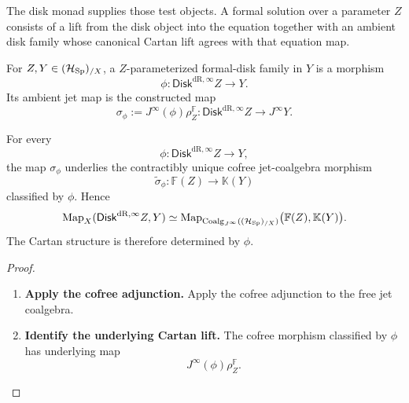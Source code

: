 The disk monad supplies those test objects. A formal solution over a parameter
\(Z\) consists of a lift from the disk object into the equation together with
an ambient disk family whose canonical Cartan lift agrees with that equation
map.
\begin{definition}
For \(Z,Y\in(\mathcal H_{\operatorname{Sp}})_{/X}\), a \(Z\)-parameterized formal-disk family in
\(Y\) is a morphism
\[
  \phi:\mathsf{Disk}^{\mathrm{dR},\infty} Z\to Y.
\]
Its ambient jet map is the constructed map
\[
  \sigma_\phi
  :=
  J^\infty(\phi)\rho_Z^{\mathbb F}:
  \mathsf{Disk}^{\mathrm{dR},\infty} Z\to J^\infty Y.
\]
\end{definition}

\begin{theorem}
For every
\[
  \phi:\mathsf{Disk}^{\mathrm{dR},\infty} Z\to Y,
\]
the map \(\sigma_\phi\) underlies the contractibly unique cofree jet-coalgebra
morphism
\[
  \widetilde\sigma_\phi:
  \mathbb F(Z)\to\mathbb K(Y)
\]
classified by \(\phi\). Hence
\[
  \operatorname{Map}_X(\mathsf{Disk}^{\mathrm{dR},\infty} Z,Y)
  \simeq
  \operatorname{Map}_{\operatorname{Coalg}_{J^\infty}((\mathcal H_{\operatorname{Sp}})_{/X})}
  \bigl(\mathbb F(Z),\mathbb K(Y)\bigr).
\]
The Cartan structure is therefore determined by \(\phi\).
\end{theorem}

\begin{proof}
\leavevmode
\begin{enumerate}[label=\textup{(\arabic*)}]
    \item \textbf{Apply the cofree adjunction.}
Apply the cofree adjunction to the free jet coalgebra.

    \item \textbf{Identify the underlying Cartan lift.}
The cofree morphism
classified by \(\phi\) has underlying map
\[
  J^\infty(\phi)\rho_Z^{\mathbb F}.
\]
\end{enumerate}
\end{proof}

